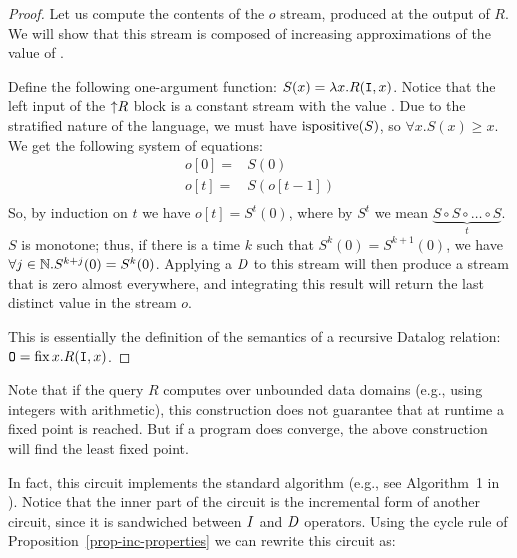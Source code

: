 \begin{proof}
Let us compute the contents of the $o$ stream, produced at the output
of $R$.  We will show that this stream is composed
of increasing approximations of the value of .

Define the following one-argument function: $S(x) = \lambda x . R(\mbox{\texttt{I}}, x)$.
Notice that the left input of the ${\uparrow}R$ block is a constant stream
with the value .  Due to the stratified nature of the language,
we must have $\mbox{ispositive}(S)$, so $\forall x . S(x) \geq x$.
We get the following system of equations:
$$
\begin{aligned}
o[0] =& S(0) \\
o[t] =& S(o[t-1]) \\
\end{aligned}
$$
So, by induction on $t$ we have $o[t] = S^t(0)$, where by
$S^t$ we mean $\underbrace{S \circ S \circ \ldots \circ S}_{t}$.
$S$ is monotone; thus, if there is a time $k$ such that $S^k(0) = S^{k+1}(0)$, we have
$\forall j \in \mathbb{N} . S^{k+j}(0) = S^k(0)$.  Applying a $\mathit{D}$ to this stream
will then produce a stream that is zero almost everywhere, and integrating
this result will return the last distinct value in the stream $o$.

This is essentially the definition of the semantics of a recursive Datalog relation:
$\mbox{\texttt{O}} = \mbox{fix}\,x.R(\mbox{\texttt{I}}, x)$.
\end{proof}

Note that if the query $R$ computes over unbounded data domains (e.g.,
using integers with arithmetic), this construction does not guarantee
that at runtime a fixed point is reached.  But if a program does converge, the
above construction will find the least fixed point.

In fact, this circuit implements the standard 
algorithm (e.g., see Algorithm~1 in \cite{greco-sldm15}).
Notice that the inner part of the circuit is the incremental
form of another circuit, since it is sandwiched between $\mathit{I}$ and $\mathit{D}$ operators.
Using the cycle rule of Proposition~\ref{prop-inc-properties} we can rewrite this circuit as:
%
\begin{center}
\end{center}

